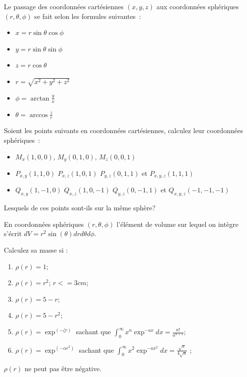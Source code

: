 \documentclass{article}
\begin{document}
Le passage des coordonn\'ees cart\'esiennes $(x,y,z)$ aux coordonn\'ees sph\'eriques $(r,\theta,\phi)$
se fait selon les formules suivantes~:
\begin{itemize}
\item $x=r\sin\theta\cos\phi$
\item $y=r\sin\theta\sin\phi$
\item $z=r\cos\theta$
\item $r=\sqrt{x^2+y^2+z^2}$
\item $\phi = \arctan\frac{y}{x}$
\item $\theta = \arccos\frac{z}{r}$
\end{itemize}
Soient les points suivants en coordonn\'ees cart\'esiennes, calculez leur coordonn\'ees sph\'eriques~:
\begin{itemize}
\item $M_x(1,0,0)$, $M_y(0,1,0)$, $M_z(0,0,1)$
\item $P_{x,y}(1,1,0)$ $P_{x,z}(1,0,1)$ $P_{y,z}(0,1,1)$ et $P_{x,y,z}(1,1,1)$
\item $Q_{x,y}(1,-1,0)$ $Q_{x,z}(1,0,-1)$ $Q_{y,z}(0,-1,1)$ et $Q_{x,y,z}(-1,-1,-1)$
\end{itemize}
Lesquels de ces points sont-ils sur la m\^eme sph\`ere?

En coordonn\'ees sph\'eriques $(r,\theta,\phi)$ l'\'el\'ement de volume sur lequel on int\`egre
s'\'ecrit $dV=r^2\sin(\theta)drd\theta d\phi$.

Calculez sa masse si :
\begin{enumerate}
\item $\rho(r)=1$;
\item $\rho(r)=r^{2}$; $r<=3cm$;
\item $\rho(r)=5-r$;
\item $\rho(r)=5-r^{2}$;
\item $\rho(r)=\exp^{(-\zeta r)}$ sachant que $\int_{0}^{\infty}x^{n}\exp^{-ax}dx=\frac{n!}{a^{n+1}}$;
\item $\rho(r)=\exp^{(-\alpha r^{2})}$ sachant que $\int_{0}^{\infty}x^{2}\exp^{-ax^{2}}dx=\frac{\sqrt{\pi}}{4\sqrt{a}}$
;
\end{enumerate}
$\rho(r)$ ne peut pas \^etre n\'egative.
\end{document}
